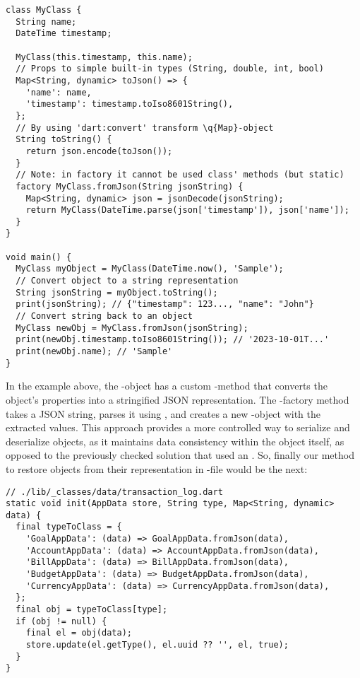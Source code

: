 \begin{lstlisting}
class MyClass {
  String name;
  DateTime timestamp;

  MyClass(this.timestamp, this.name);
  // Props to simple built-in types (String, double, int, bool)
  Map<String, dynamic> toJson() => {
    'name': name,
    'timestamp': timestamp.toIso8601String(),
  };
  // By using 'dart:convert' transform \q{Map}-object
  String toString() {
    return json.encode(toJson());
  }
  // Note: in factory it cannot be used class' methods (but static)
  factory MyClass.fromJson(String jsonString) {
    Map<String, dynamic> json = jsonDecode(jsonString);
    return MyClass(DateTime.parse(json['timestamp']), json['name']);
  }
}

void main() {
  MyClass myObject = MyClass(DateTime.now(), 'Sample');
  // Convert object to a string representation
  String jsonString = myObject.toString();
  print(jsonString); // {"timestamp": 123..., "name": "John"}
  // Convert string back to an object
  MyClass newObj = MyClass.fromJson(jsonString);
  print(newObj.timestamp.toIso8601String()); // '2023-10-01T...'
  print(newObj.name); // 'Sample'
}
\end{lstlisting}

\noindent In the example above, the -object has a custom -method that converts the object's 
properties into a stringified JSON representation. The -factory method takes a JSON string, parses it using 
, and creates a new -object with the extracted values. This approach provides a more 
controlled way to serialize and deserialize objects, as it maintains data consistency within the object itself,
as opposed to the previously checked solution that used an . So, finally our method to restore objects 
from their representation in -file would be the next:

\begin{lstlisting}[firstnumber=54]
// ./lib/_classes/data/transaction_log.dart
static void init(AppData store, String type, Map<String, dynamic> data) {
  final typeToClass = {
    'GoalAppData': (data) => GoalAppData.fromJson(data),
    'AccountAppData': (data) => AccountAppData.fromJson(data),
    'BillAppData': (data) => BillAppData.fromJson(data),
    'BudgetAppData': (data) => BudgetAppData.fromJson(data),
    'CurrencyAppData': (data) => CurrencyAppData.fromJson(data),
  };
  final obj = typeToClass[type];
  if (obj != null) {
    final el = obj(data);
    store.update(el.getType(), el.uuid ?? '', el, true);
  }
}
\end{lstlisting}


